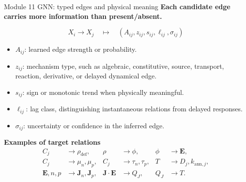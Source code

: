 \documentclass[aspectratio=169,10pt]{beamer}
\begin{document}
\begin{frame}{Module 11 GNN: typed edges and physical meaning}
\footnotesize
\textbf{Each candidate edge carries more information than present/absent.}

\vspace{-0.2em}
\begin{equation*}
\boxed{
X_i\rightarrow X_j
\quad\mapsto\quad
\left(A_{ij},z_{ij},s_{ij},\ell_{ij},\sigma_{ij}\right)
}
\end{equation*}

\vspace{-0.25em}
\begin{itemize}
    \item $A_{ij}$: learned edge strength or probability.
    \item $z_{ij}$: mechanism type, such as algebraic, constitutive, source, transport, reaction, derivative, or delayed dynamical edge.
    \item $s_{ij}$: sign or monotonic trend when physically meaningful.
    \item $\ell_{ij}$: lag class, distinguishing instantaneous relations from delayed responses.
    \item $\sigma_{ij}$: uncertainty or confidence in the inferred edge.
\end{itemize}

\vspace{-0.15em}
\textbf{Examples of target relations}
\vspace{-0.2em}
\begin{align*}
C_j&\rightarrow \rho_{\mathrm{def}}, &
\rho&\rightarrow \phi, &
\phi&\rightarrow \mathbf E,\\[-0.15em]
C_j&\rightarrow \mu_n,\mu_p, &
C_j&\rightarrow \tau_n,\tau_p, &
T&\rightarrow D_j,k_{\mathrm{ann},j},\\[-0.15em]
\mathbf E,n,p&\rightarrow \mathbf J_n,\mathbf J_p, &
\mathbf J\cdot\mathbf E&\rightarrow Q_J, &
Q_J&\rightarrow T.
\end{align*}
\end{frame}
\end{document}
